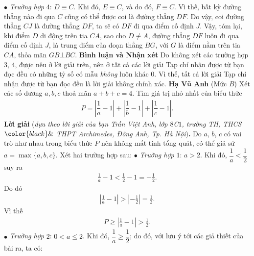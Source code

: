 \begin{multicols}{2}
\begin{figure}[H]
		\vspace*{-15pt}
	\end{figure}
	$\bullet$ \textit{Trường hợp} $4$: $D \equiv C$.
	\vskip 0.05cm
	Khi đó, $E \equiv C$, và do đó, $F \equiv C$. Vì thế, bất kỳ đường thẳng nào đi qua $C$ cũng có thể được coi là đường thẳng $DF$. Do vậy, coi đường thẳng $CJ$ là đường thẳng $DF$, ta sẽ có $DF$ đi qua điểm cố định $J$.
	\vskip 0.05cm
	Vậy, tóm lại, khi điểm $D$ di động trên tia $CA$, sao cho  $D \not\equiv A$, đường thẳng $DF$ luôn đi qua điểm cố định $J$, là trung điểm của đoạn thẳng $BG$, với $G$ là điểm nằm trên tia $CA$, thỏa mãn $GB \bot BC$.
	\vskip 0.05cm
	\textbf{\color{thachthuctoanhoc}Bình luận và Nhận xét}
	\vskip 0.05cm
	Do không xét các trường hợp $3$, $4$, được nêu ở lời giải trên, nên ở tất cả các lời giải Tạp chí nhận được từ bạn đọc đều có những tỷ số có mẫu \textit{không} luôn khác $0$. Vì thế, tất cả lời giải Tạp chí nhận được từ bạn đọc đều là lời giải không chính xác.
	\vskip 0.05cm
	\hfill	\textbf{\color{thachthuctoanhoc}Hạ Vũ Anh}
	\vskip 0.05cm
	{}
	(Mức $B$) Xét các số dương $a,b,c$ thoả mãn $a+b+c=4$. Tìm giá trị nhỏ nhất của biểu thức 
	\begin{align*}
		P=\left|\dfrac 1a-1\right|+\left|\dfrac 1b-1\right|+\left|\dfrac 1c-1\right|.
	\end{align*}
	\textbf{\color{thachthuctoanhoc}Lời giải} (\textit{dựa theo lời giải của bạn Trần Việt Anh, lớp $8$C$1$, trường TH, THCS $\color{black}\&$ THPT Archimedes, Đông Anh, Tp. Hà Nội})\textbf{\color{thachthuctoanhoc}.}
	\vskip 0.05cm
	Do $a$, $b$, $c$ có vai trò như nhau trong biểu thức $P$ nên không mất tính tổng quát, có thể giả sử $a = \max\{a, b, c\}$.
	\vskip 0.05cm
	Xét hai trường hợp sau:
	\vskip 0.05cm
	$\bullet$ \textit{Trường hợp} $1$: $a > 2$.
	\vskip 0.05cm
	Khi đó, $\dfrac{1}{a} < \dfrac{1}{2}$  suy ra
	\begin{align*}
		\frac{1}{a} - 1 < \frac{1}{2} - 1 =  - \frac{1}{2}.
	\end{align*}
	Do đó
	\begin{align*}
		\left| {\frac{1}{a} - 1} \right| > \left| { - \frac{1}{2}} \right| = \frac{1}{2}.
	\end{align*}
	Vì thế
	\begin{align*}
		P \ge \left| {\frac{1}{a} - 1} \right| > \frac{1}{2}.
	\end{align*}
	$\bullet$ \textit{Trường hợp} $2$: $0 < a \le 2$.
	\vskip 0.05cm
	Khi đó, $\dfrac{1}{a} \ge \dfrac{1}{2}$; do đó, với lưu ý tới các giả thiết của bài ra, ta có:

\end{multicols}
